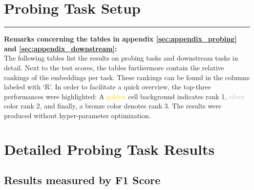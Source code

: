 %
%

\section{Probing Task Setup}
\label{sec:appendix_probing_task_setup}



\newpage



\vfill
\hrule
\textbf{Remarks concerning the tables in appendix \vref{sec:appendix_probing} and \vref{sec:appendix_downstream}:} \\
The following tables list the results on probing tasks and downstream tasks in detail. Next to the test scores, the tables furthermore contain the relative rankings of the embeddings per task. These rankings can be found in the columns labeled with `R'. In order to facilitate a quick overview, the top-three performances were highlighted: A \textcolor{gold}{golden} cell background indicates rank 1, \textcolor{silver}{silver} color rank 2, and finally, a \textcolor{bronze}{bronze} color denotes rank 3. The results were produced without hyper-parameter optimization.

\newpage

\section{Detailed Probing Task Results}
\label{sec:appendix_probing}

\subsection{Results measured by F1 Score}







